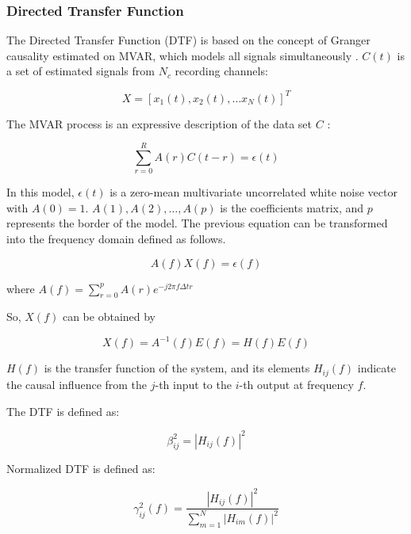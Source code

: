 \subsubsection{Directed Transfer Function}

The Directed Transfer Function (DTF) is based on the concept of Granger causality estimated on MVAR, which models all signals simultaneously \cite{rezaei2023classification}. $C(t)$ is a set of estimated signals from $N_c$ recording channels:

\begin{equation}
X=\left[x_{1}(t), x_{2}(t), \ldots x_{N}(t)\right]^{T}
\end{equation}

The MVAR process is an expressive description of the data set $C$ :

\begin{equation}
\sum_{r=0}^{R} A(r) C(t-r)=\epsilon(t)
\end{equation}

In this model, $\epsilon(t)$ is a zero-mean multivariate uncorrelated white noise vector with $A(0)=1$. $A(1), A(2), \ldots, A(p)$ is the coefficients matrix, and $p$ represents the border of the model. The previous equation can be transformed into the frequency domain defined as follows.

\begin{equation}
A(f) X(f)=\epsilon(f)
\end{equation}

where $A(f)=\sum_{r=0}^{p} A(r) e^{-j 2 \pi f \Delta t r}$

So, $X(f)$ can be obtained by

\begin{equation}
X(f)=A^{-1}(f) E(f)=H(f) E(f)
\end{equation}

$H(f)$ is the transfer function of the system, and its elements $H_{i j}(f)$ indicate the causal influence from the $j$-th input to the $i$-th output at frequency $f$.

The DTF is defined as:

\begin{equation}
\beta_{i j}^{2}=\left|H_{i j}(f)\right|^{2}
\end{equation}

Normalized DTF is defined as:

\begin{equation}
\gamma_{i j}^{2}(f)=\frac{\left|H_{i j}(f)\right|^{2}}{\sum_{m=1}^{N}\left|H_{i m}(f)\right|^{2}}
\end{equation}

